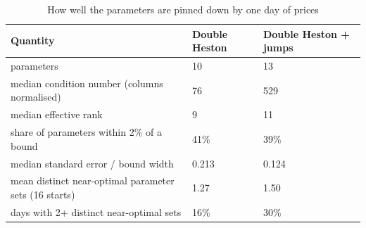 \begin{table}[ht]
\centering
\small
\caption{How well the parameters are pinned down by one day of prices}
\begin{tabular}{lll}
\toprule
Quantity & Double Heston & Double Heston + jumps \\
\midrule
parameters & 10 & 13 \\
median condition number (columns normalised) & 76 & 529 \\
median effective rank & 9 & 11 \\
share of parameters within 2\% of a bound & 41\% & 39\% \\
median standard error / bound width & 0.213 & 0.124 \\
mean distinct near-optimal parameter sets (16 starts) & 1.27 & 1.50 \\
days with 2+ distinct near-optimal sets & 16\% & 30\% \\
\bottomrule
\end{tabular}
\par{}
\end{table}
